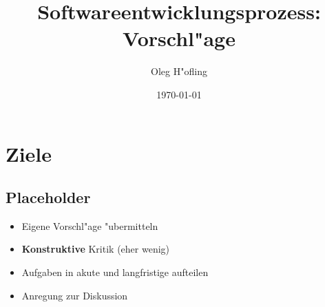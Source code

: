 \documentclass{beamer}
\newcommand{\cmark}{\ding{51}}
\begin{document}
\title{Softwareentwicklungsprozess: \\ Vorschl"age}
\date{\today}
\author{Oleg H"ofling}
\frame{\maketitle}


\section{Ziele}
\subsection{Placeholder}
\begin{frame}
	\begin{itemize}
		\item[\cmark] Eigene Vorschl"age "ubermitteln
		\item[\cmark] \textbf{Konstruktive} Kritik (eher wenig)
		\item[\cmark] Aufgaben in akute und langfristige aufteilen
		\item[\cmark] Anregung zur Diskussion
	\end{itemize}
\end{frame}
\end{document}
